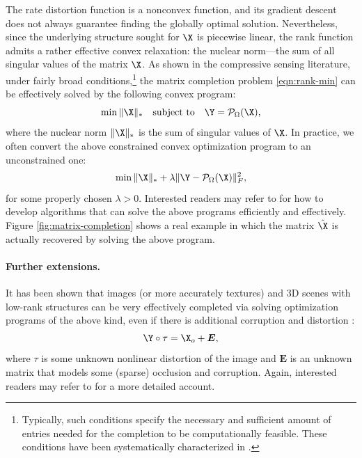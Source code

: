 \documentclass[../../book-main.tex]{subfiles}
\begin{document}
The rate distortion function is a nonconvex function, and its gradient
descent does not always guarantee finding the globally optimal solution. Nevertheless, since the underlying structure sought for $\X$ is piecewise linear, the rank function admits a rather effective convex relaxation: the
nuclear norm---the sum of all singular values of the matrix $\X$. As
shown in the compressive sensing literature, under fairly
broad conditions,\footnote{Typically, such conditions specify the
necessary and sufficient amount of entries needed for the completion
to be computationally feasible. These conditions have been
systematically characterized in \cite{Wright-Ma-2022}.} the matrix
completion problem \eqref{eqn:rank-min}
can be effectively solved by the following convex program:
\begin{equation}
\min \|\X\|_* \quad \mbox{subject to}
\quad
\Y = \mathcal{P}_{\Omega}(\X),
\label{eqn:nuclear-min}
\end{equation}
where the nuclear norm $\|\X\|_*$ is the sum of singular values of
$\X$. In practice, we often convert the above constrained convex optimization
program to an unconstrained one:
\begin{equation}
\min \|\X\|_*  + \lambda \|
\Y - \mathcal{P}_{\Omega}(\X)\|_F^2,
\label{eqn:nuclear-min-lagrangian}
\end{equation}
for some properly chosen $\lambda > 0$. Interested readers may refer to
\cite{Wright-Ma-2022} for how to develop algorithms  that can solve
the above programs  efficiently and effectively.
Figure \ref{fig:matrix-completion} shows a real example in which the
matrix $\hat \X$ is actually recovered by solving the above program.

\paragraph{Further extensions.}
It has been shown that images (or more accurately textures) and 3D scenes
with low-rank structures can be very effectively completed via
solving optimization programs of the above kind,  even if there is
additional corruption and distortion
\cite{Zhang2010TILTTI,Liang-ECCV2012,Yi_2023_ICCV}:
\begin{equation}
    \Y \circ \tau = \X_o + \boldsymbol{E},
\end{equation}
where $\tau$ is some unknown nonlinear distortion of the image and $\boldsymbol{E}$ is an unknown matrix that models some (sparse) occlusion and corruption. Again, interested readers may refer to \cite{Wright-Ma-2022} for a more detailed account.
\end{document}
